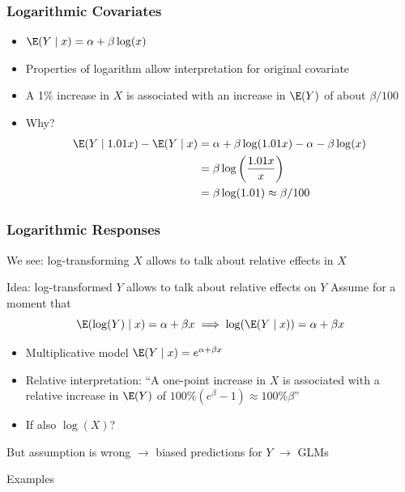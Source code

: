 \begin{frame}
	\frametitle{Logarithmic Covariates}
	\begin{itemize}
		\item $\E(Y \mid x) = \alpha + \beta\log(x)$
		\item Properties of logarithm allow interpretation \alert{for original covariate}
		\item A 1\% increase in $X$ is associated with an increase in $\E(Y)$ of about $\beta/100$
		\item Why?
		\begin{align*}
			\E(Y\mid 1.01x) - \E(Y\mid x) &= \alpha + \beta \log (1.01x) - \alpha - \beta \log(x) \\
			&= \beta \log\left(\frac{1.01x}{x}\right) \\
			&= \beta \log(1.01) \approx \beta/100
		\end{align*}
	
		\vfill
		
		\begin{example}
		\end{example}
	\end{itemize}
\end{frame}

\begin{frame}
	\frametitle{Logarithmic Responses}
	We see: log-transforming $X$ allows to talk about relative effects in $X$
	
	\vfill
	
	\begin{block}{Idea: log-transformed $Y$ allows to talk about relative effects on $Y$}
		Assume for a moment that
		$$
			\E(\log(Y) \mid x) = \alpha + \beta x \implies \log(\E(Y \mid x)) = \alpha + \beta x
		$$
		\vspace*{-1.2em}
		\begin{itemize}
			\item Multiplicative model $\E(Y\mid x) = e^{\alpha + \beta x}$
			\item Relative interpretation: ``A one-point increase in $X$ is associated with a relative increase in $\E(Y)$ of $100\%(e^\beta - 1)\approx 100\% \beta$''
			\item If also $\log(X)$?
		\end{itemize}
	\end{block}

	\vfill
	
	But assumption is wrong $\rightarrow$ biased predictions for $Y$ $\rightarrow$ GLMs

	\vfill
	
	\begin{exampleblock}{Examples}
	\end{exampleblock}
\end{frame}

